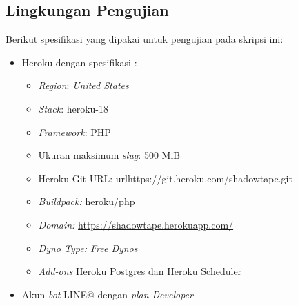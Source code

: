 \subsection{Lingkungan Pengujian}
Berikut spesifikasi yang dipakai untuk pengujian pada skripsi ini:
\begin{itemize}
\item Heroku dengan spesifikasi :

\begin{itemize}
\item \textit{Region}: \textit{United States}
\item \textit{Stack}: heroku-18
\item \textit{Framework}: PHP
\item Ukuran maksimum \textit{slug}: 500 MiB
\item Heroku Git URL: url{https://git.heroku.com/shadowtape.git}
\item \textit{Buildpack:} heroku/php
\item \textit{Domain:} \url{https://shadowtape.herokuapp.com/}
\item \textit{Dyno Type: Free Dynos}
\item \textit{Add-ons} Heroku Postgres dan Heroku Scheduler
\end{itemize}

\item Akun \textit{bot} LINE@ dengan \textit{plan Developer}
\end{itemize}

